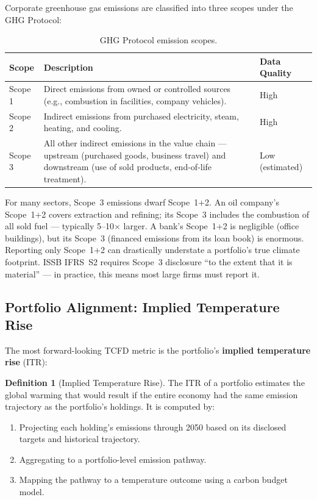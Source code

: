 \documentclass[11pt, a4paper]{article}
\theoremstyle{definition}
\newtheorem{definition}{Definition}[section]
\theoremstyle{plain}
\theoremstyle{remark}
\begin{document}
Corporate greenhouse gas emissions are classified into three scopes under the
GHG Protocol:

\begin{table}[H]
\centering
\caption{GHG Protocol emission scopes.}
\label{tab:emission-scopes}
\begin{tabular}{@{}lp{7cm}l@{}}
\toprule
\textbf{Scope} & \textbf{Description} & \textbf{Data Quality} \\
\midrule
Scope 1 & Direct emissions from owned or controlled sources
          (e.g., combustion in facilities, company vehicles). & High \\[4pt]
Scope 2 & Indirect emissions from purchased electricity, steam,
          heating, and cooling. & High \\[4pt]
Scope 3 & All other indirect emissions in the value chain ---
          upstream (purchased goods, business travel) and downstream
          (use of sold products, end-of-life treatment). & Low (estimated) \\
\bottomrule
\end{tabular}
\end{table}

\begin{warningbox}
For many sectors, Scope~3 emissions dwarf Scope~1+2.
An oil company's Scope~1+2 covers extraction and refining; its Scope~3 includes
the combustion of all sold fuel --- typically 5--10$\times$ larger.
A bank's Scope~1+2 is negligible (office buildings), but its Scope~3 (financed
emissions from its loan book) is enormous.
Reporting only Scope~1+2 can drastically understate a portfolio's true climate
footprint.
ISSB IFRS~S2 requires Scope~3 disclosure ``to the extent that it is material''
--- in practice, this means most large firms must report it.
\end{warningbox}

\subsection{Portfolio Alignment: Implied Temperature Rise}

The most forward-looking TCFD metric is the portfolio's \textbf{implied
temperature rise} (ITR):

\begin{definition}[Implied Temperature Rise]\label{def:itr}
The ITR of a portfolio estimates the global warming that would result if the
entire economy had the same emission trajectory as the portfolio's holdings.
It is computed by:
\begin{enumerate}
    \item Projecting each holding's emissions through 2050 based on its
          disclosed targets and historical trajectory.
    \item Aggregating to a portfolio-level emission pathway.
    \item Mapping the pathway to a temperature outcome using a carbon budget
          model.
\end{enumerate}
\end{definition}
\end{document}
